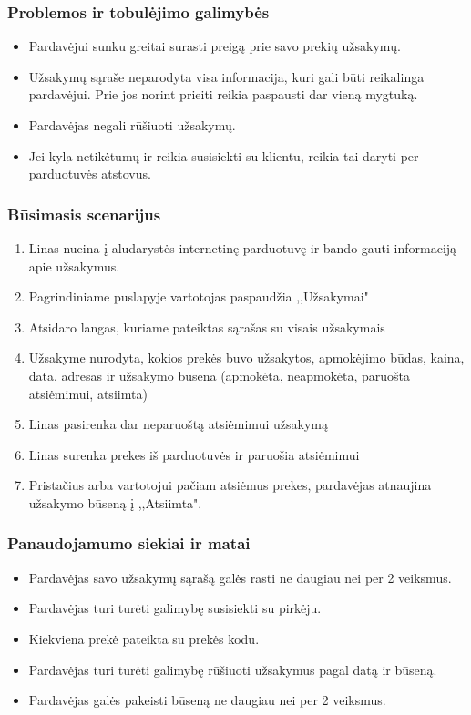 \documentclass[oneside]{VUMIFPSkursinis}
\begin{document}
		\subsubsection{Problemos ir tobulėjimo galimybės}
			\begin{itemize}
				\item{Pardavėjui sunku greitai surasti preigą prie savo prekių užsakymų.}
				\item{Užsakymų sąraše neparodyta visa informacija, kuri gali būti reikalinga pardavėjui. Prie jos norint prieiti reikia paspausti dar vieną mygtuką.}
				\item{Pardavėjas negali rūšiuoti užsakymų.}
				\item{Jei kyla netikėtumų ir reikia susisiekti su klientu, reikia tai daryti per parduotuvės atstovus.}
			\end{itemize}

		\subsubsection{Būsimasis scenarijus}
			\begin{enumerate}
				\item{Linas nueina į aludarystės internetinę parduotuvę ir bando gauti informaciją apie užsakymus.}
				\item{Pagrindiniame puslapyje vartotojas paspaudžia ,,Užsakymai"}
				\item{Atsidaro langas, kuriame pateiktas sąrašas su visais užsakymais}
				\item{Užsakyme nurodyta, kokios prekės buvo užsakytos, apmokėjimo būdas, kaina, data, adresas ir užsakymo būsena (apmokėta, neapmokėta, paruošta atsiėmimui, atsiimta)}
				\item{Linas pasirenka dar neparuoštą atsiėmimui užsakymą}
				\item{Linas surenka prekes iš parduotuvės ir paruošia atsiėmimui}
				\item{Pristačius arba vartotojui pačiam atsiėmus prekes, pardavėjas atnaujina užsakymo būseną į ,,Atsiimta".}
				\end{enumerate}
	\subsubsection{Panaudojamumo siekiai ir matai}
		\begin{itemize}
			\item{Pardavėjas savo užsakymų sąrašą galės rasti ne daugiau nei per 2 veiksmus.}
			\item{Pardavėjas turi turėti galimybę susisiekti su pirkėju.}
			\item{Kiekviena prekė pateikta su prekės kodu.}
			\item{Pardavėjas turi turėti galimybę rūšiuoti užsakymus pagal datą ir būseną.}
			\item{Pardavėjas galės pakeisti būseną ne daugiau nei per 2 veiksmus.}
		\end{itemize}
\end{document}
